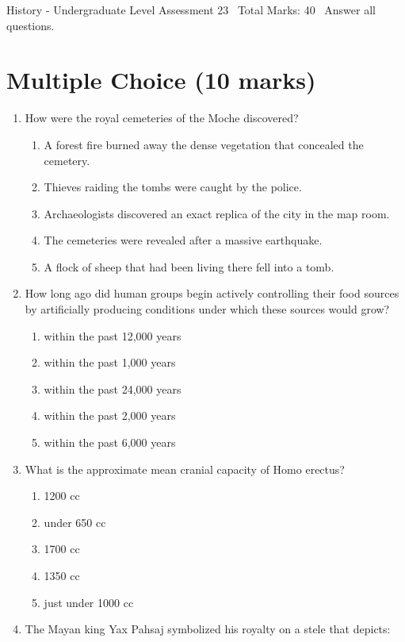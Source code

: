 \documentclass[12pt]{article}
\begin{document}
\begin{center}
History - Undergraduate Level Assessment 23 \
Total Marks: 40 \
Answer all questions.
\end{center}

\section*{Multiple Choice (10 marks)}
\begin{enumerate}[label=\arabic*.]
\item How were the royal cemeteries of the Moche discovered?
\begin{enumerate}[label=(\alph*)]
    \item A forest fire burned away the dense vegetation that concealed the cemetery.
    \item Thieves raiding the tombs were caught by the police.
    \item Archaeologists discovered an exact replica of the city in the map room.
    \item The cemeteries were revealed after a massive earthquake.
    \item A flock of sheep that had been living there fell into a tomb.
\end{enumerate}
\item How long ago did human groups begin actively controlling their food sources by artificially producing conditions under which these sources would grow?
\begin{enumerate}[label=(\alph*)]
    \item within the past 12,000 years
    \item within the past 1,000 years
    \item within the past 24,000 years
    \item within the past 2,000 years
    \item within the past 6,000 years
\end{enumerate}
\item What is the approximate mean cranial capacity of Homo erectus?
\begin{enumerate}[label=(\alph*)]
    \item 1200 cc
    \item under 650 cc
    \item 1700 cc
    \item 1350 cc
    \item just under 1000 cc
\end{enumerate}
\item The Mayan king Yax Pahsaj symbolized his royalty on a stele that depicts:

\end{enumerate}
\end{document}
